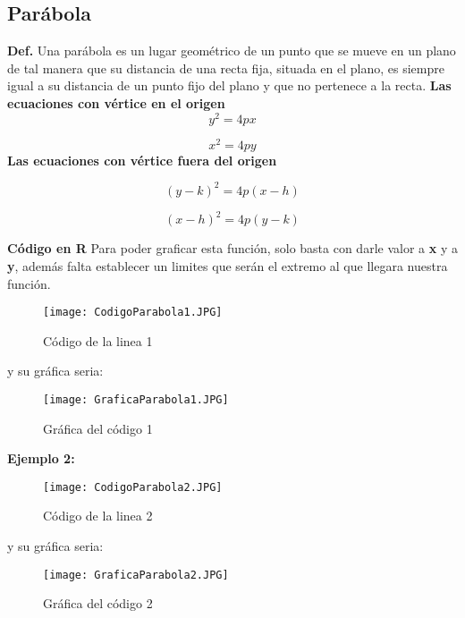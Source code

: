 \documentclass{article}
\begin{document}
\subsection{Parábola}
\textbf{Def.} Una parábola es un lugar geométrico de un punto que se mueve en un plano de tal manera que su distancia de una recta fija, situada en el plano, es siempre igual a su distancia de un punto fijo del plano y que no pertenece a la recta.
\newline
\textbf{Las ecuaciones con vértice en el origen}
\begin{equation}
y^2 = 4px
\end{equation}

\begin{equation}
x^2 = 4py
\end{equation}
\newline
\textbf{Las ecuaciones con vértice fuera del origen}

\begin{equation}
(y-k)^2 = 4p(x-h)
\end{equation}

\begin{equation}
(x-h)^2 = 4p(y-k)
\end{equation}

\textbf{Código en R}
\newline Para poder graficar esta función, solo basta con darle valor a \textbf{x} y a \textbf{y}, además falta establecer un limites que serán el extremo al que llegara nuestra función.
\newpage

\begin{figure}
\raggedright
\texttt{[image: CodigoParabola1.JPG]}
\caption{Código de la linea 1}
\label{fig:mesh9}
\end{figure}
y su gráfica seria:
\begin{figure}[h]
\centering
\texttt{[image: GraficaParabola1.JPG]}
\caption{Gráfica del código 1}
\label{fig:mesh10}
\end{figure}

\textbf{Ejemplo 2:}
\newpage

\begin{figure}
\raggedright
\texttt{[image: CodigoParabola2.JPG]}
\caption{Código de la linea 2}
\label{fig:mesh11}
\end{figure}
y su gráfica seria:
\begin{figure}[h]
\centering
\texttt{[image: GraficaParabola2.JPG]}
\caption{Gráfica del código 2}
\label{fig:mesh12}
\end{figure}
\end{document}
